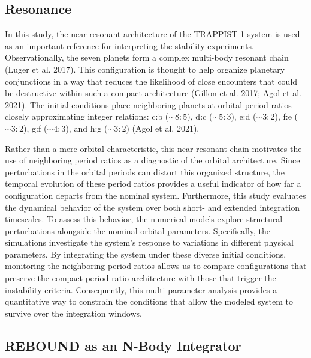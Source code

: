 \documentclass{aa}
\begin{document}
\subsection{Resonance}
In this study, the near-resonant architecture of the TRAPPIST-1 system
is used as an important reference for interpreting the stability
experiments. Observationally, the seven planets form a complex multi-body
resonant chain (Luger et al. 2017). This configuration is thought to help
organize planetary conjunctions in a way that reduces the likelihood of
close encounters that could be destructive within such a compact
architecture (Gillon et al. 2017; Agol et al. 2021). The initial
conditions place neighboring planets at orbital period ratios closely
approximating integer relations: c:b ($\sim 8:5$), d:c ($\sim 5:3$),
e:d ($\sim 3:2$), f:e ($\sim 3:2$), g:f ($\sim 4:3$), and h:g
($\sim 3:2$) (Agol et al. 2021).

Rather than a mere orbital characteristic, this near-resonant chain motivates the use of neighboring period ratios as a diagnostic of the orbital architecture. Since perturbations in the orbital periods can distort this organized structure, the temporal evolution of these period ratios provides a useful indicator of how far a configuration departs from the nominal system. Furthermore, this study evaluates the dynamical behavior of the system over both short- and extended integration timescales. To assess this behavior, the numerical models explore structural perturbations alongside the nominal orbital parameters. Specifically, the simulations investigate the system's response to variations in different physical parameters. By integrating the system under these diverse initial conditions, monitoring the neighboring period ratios allows us to compare configurations that preserve the compact period-ratio architecture with those that trigger the instability criteria. Consequently, this multi-parameter analysis provides a quantitative way to constrain the conditions that allow the modeled system to survive over the integration windows.

\subsection{REBOUND as an N-Body Integrator}
\end{document}
